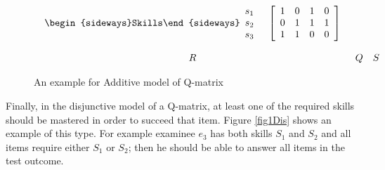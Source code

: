 \begin{figure}[h]
\begin{footnotesize}
\[\begin{array}{ccc}
\begin{array}{cc}
\mathrm{\begin{sideways}Skills\end{sideways}}\begin{array}{c}
s_{1}\\
s_{2}\\
s_{3}
\end{array} & \left[\begin{array}{cccc}
1 & 0 & 1 & 0\\
0 & 1 & 1 & 1\\
1 & 1 & 0 & 0
\end{array}\right]
\end{array}\\
\\
R & Q & S
\end{array}
\]
 \end{footnotesize} \caption{An example for Additive model of Q-matrix}


\label{fig1Add} 
\end{figure}

Finally, in the disjunctive model of a Q-matrix, at least one of the required skills should be mastered in order to succeed that item. Figure \ref{fig1Dis} shows an example of this type. For example examinee $e_{3}$ has both skills $S_{1}$ and $S_{2}$ and all items require either $S_{1}$ or $S_{2}$; then he should be able to answer all items in the test outcome. 



